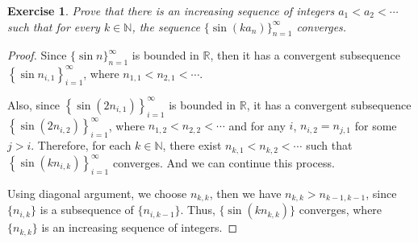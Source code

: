 \documentclass[11pt]{article}
\newtheorem{exercise}{Exercise}[section]
\theoremstyle{definition}
\numberwithin{equation}{subsection}
\begin{document}
\begin{exercise}
Prove that there is an increasing sequence of integers $a_1 < a_2 < \cdots$ such that for every $k \in \mathbb{N}$, the sequence $\{\sin (k a_n)\}^\infty_{n=1}$ converges.
\end{exercise}
\begin{proof}
Since $\{\sin n\}^\infty_{n=1}$ is bounded in $\mathbb{R}$, then it has a convergent subsequence $\left\{\sin n_{i,1} \right\}^\infty_{i = 1}$, where $n_{1,1} < n_{2,1} < \cdots$.

Also, since $\left\{\sin (2n_{i,1}) \right\}^\infty_{i=1}$ is bounded in $\mathbb{R}$, it has a convergent subsequence $\left\{\sin (2n_{i,2}) \right\}^\infty_{i=1}$, where $n_{1,2} < n_{2,2} < \cdots$ and for any $i$, $n_{i, 2} = n_{j,1}$ for some $j > i$. Therefore, for each $k \in \mathbb{N}$, there exist $n_{k,1} < n_{k,2} < \cdots$ such that $\left\{\sin (kn_{i,k}) \right\}^\infty_{i=1}$ converges. And we can continue this process.

Using diagonal argument, we choose $n_{k,k}$, then we have $n_{k,k} > n_{k-1, k-1}$, since $\{n_{i, k}\}$ is a subsequence of $\{n_{i,k-1}\}$. Thus, $\{\sin (k n_{k,k})\}$ converges, where $\{n_{k,k}\}$ is an increasing sequence of integers.
\end{proof}

\medskip
\end{document}
